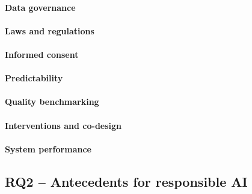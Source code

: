 \paragraph{Data governance}

\paragraph{Laws and regulations}

\paragraph{Informed consent}

\paragraph{Predictability}

\paragraph{Quality benchmarking}

\paragraph{Interventions and co-design}

\paragraph{System performance}






\subsection{RQ2 -- Antecedents for responsible AI}
\label{sec:results-rq2:antecedents}

